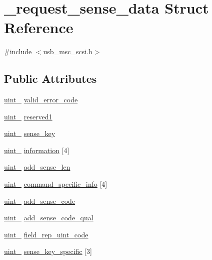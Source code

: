 \hypertarget{struct__request__sense__data}{}\section{\+\_\+request\+\_\+sense\+\_\+data Struct Reference}
\label{struct__request__sense__data}


{\ttfamily \#include $<$usb\+\_\+msc\+\_\+scsi.\+h$>$}

\subsection*{Public Attributes}
\begin{DoxyCompactItemize}
\item 
\hyperlink{types_8h_ad3209046c23f739a81581c10a4be7d92}{uint\+\_} \hyperlink{struct__request__sense__data_a4ccc7647b488c56eaf6a467af93b0955}{valid\+\_\+error\+\_\+code}
\item 
\hyperlink{types_8h_ad3209046c23f739a81581c10a4be7d92}{uint\+\_} \hyperlink{struct__request__sense__data_acbe76517557b3ec99a74e8d10c278d69}{reserved1}
\item 
\hyperlink{types_8h_ad3209046c23f739a81581c10a4be7d92}{uint\+\_} \hyperlink{struct__request__sense__data_aaeca04a72e29a449f60d203db85f9acc}{sense\+\_\+key}
\item 
\hyperlink{types_8h_ad3209046c23f739a81581c10a4be7d92}{uint\+\_} \hyperlink{struct__request__sense__data_ab8a2721dab84cfd2a096df32a67a7c20}{information} \mbox{[}4\mbox{]}
\item 
\hyperlink{types_8h_ad3209046c23f739a81581c10a4be7d92}{uint\+\_} \hyperlink{struct__request__sense__data_a5efbb08e2b83d955968e4e072d012654}{add\+\_\+sense\+\_\+len}
\item 
\hyperlink{types_8h_ad3209046c23f739a81581c10a4be7d92}{uint\+\_} \hyperlink{struct__request__sense__data_a77200b057859445b03ebaf8aa054866b}{command\+\_\+specific\+\_\+info} \mbox{[}4\mbox{]}
\item 
\hyperlink{types_8h_ad3209046c23f739a81581c10a4be7d92}{uint\+\_} \hyperlink{struct__request__sense__data_a94592c7e894cbacf123cca3f5e42517b}{add\+\_\+sense\+\_\+code}
\item 
\hyperlink{types_8h_ad3209046c23f739a81581c10a4be7d92}{uint\+\_} \hyperlink{struct__request__sense__data_aafc166465af3d3015d23dea7075d1a1e}{add\+\_\+sense\+\_\+code\+\_\+qual}
\item 
\hyperlink{types_8h_ad3209046c23f739a81581c10a4be7d92}{uint\+\_} \hyperlink{struct__request__sense__data_a0eb177c02fafa46559ec7618b2c229c7}{field\+\_\+rep\+\_\+uint\+\_\+code}
\item 
\hyperlink{types_8h_ad3209046c23f739a81581c10a4be7d92}{uint\+\_} \hyperlink{struct__request__sense__data_ad8858e6190ae797c8a27ea8c92a2d013}{sense\+\_\+key\+\_\+specific} \mbox{[}3\mbox{]}
\end{DoxyCompactItemize}


